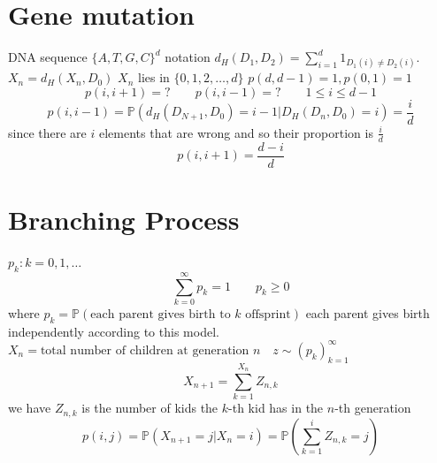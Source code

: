 \documentclass[11pt]{article}
\begin{document}
\section{Gene mutation}
DNA sequence $\{A,T,G,C\}^{d}$ 
notation  $d_H(D_1,D_2) = \sum_{i=1}^{d}1_{D_1(i) \ne D_2(i)}$.
$X_n = d_H(X_n, D_0)$ $X_n$ lies in  $\{0,1,2,\dots,d\}$
$p(d,d-1) = 1, p(0,1) = 1$
\[
p(i,i+1) = ? \qquad p(i,i-1) = ? \qquad 1 \le i \le d-1
\] 
\[
    p(i,i-1) = \mathbb{P}(d_H(D_{N+1},D_0) = i-1 | D_H(D_n, D_0) = i) = \frac{i}{d}
\] 
since there are $i$ elements that are wrong and so their proportion is $\frac{i}{d}$
\[
    p(i,i+1) = \frac{d-i}{d}
\] 

\section{Branching Process}
$p_k : k = 0,1,\dots$
\[
\sum_{k=0}^{\infty}p_k = 1 \qquad p_k \ge 0
\] 
where $p_k = \mathbb{P}(\text{each parent gives birth to $k$ offsprint})$ each parent gives birth independently according to this model.
$X_n = \text{total number of children at generation $n$ }$ 
$z \sim (p_k)_{k=1}^{\infty}$
\[
    X_{n+1} = \sum_{k=1}^{X_n}Z_{n,k}
\] 
we have $Z_{n,k}$ is the number of kids the  $k$-th kid has in the  $n$-th generation
 \[
     p(i,j) = \mathbb{P}(X_{n+1} = j | X_n = i) = \mathbb{P}(\sum_{k=1}^{i}Z_{n,k} = j)
\] 
\end{document}
